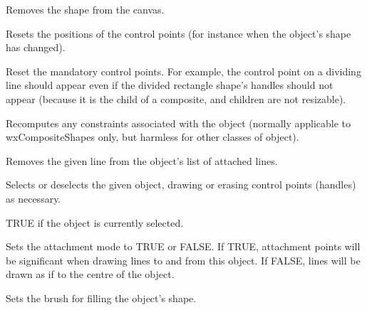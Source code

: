 Removes the shape from the canvas.



Resets the positions of the control points (for instance when the
object's shape has changed).



Reset the mandatory control points. For example, the control point on a dividing line should
appear even if the divided rectangle shape's handles should not appear (because it is the child of
a composite, and children are not resizable).



Recomputes any constraints associated with the object (normally
applicable to wxCompositeShapes only, but harmless for other
classes of object).



Removes the given line from the object's list of attached lines.



Selects or deselects the given object, drawing or erasing control points
(handles) as necessary.



TRUE if the object is currently selected.

\label{setattachmentmode}


Sets the attachment mode to TRUE or FALSE. If TRUE, attachment points
will be significant when drawing lines to and from this object.
If FALSE, lines will be drawn as if to the centre of the object.



Sets the brush for filling the object's shape.

